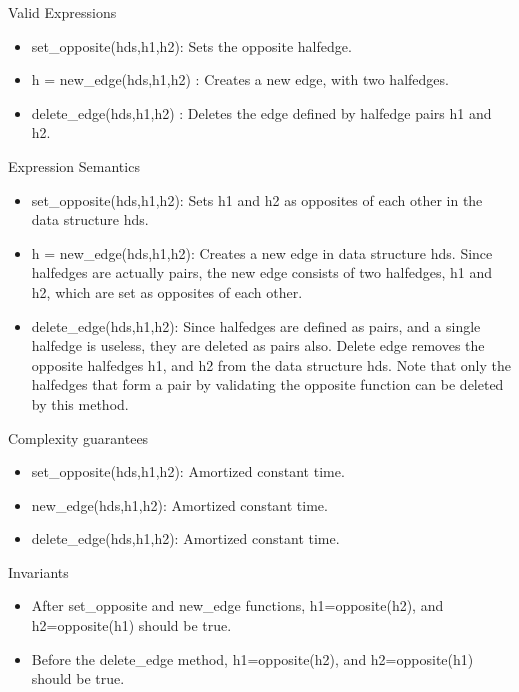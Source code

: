 \begin{Desc}
\item[Valid Expressions]\begin{itemize}
\item set\_\-opposite(hds,h1,h2): Sets the opposite halfedge.\item h = new\_\-edge(hds,h1,h2) : Creates a new edge, with two halfedges.\item delete\_\-edge(hds,h1,h2) : Deletes the edge defined by halfedge pairs h1 and h2.\end{itemize}
\end{Desc}
\begin{Desc}
\item[Expression Semantics]\begin{itemize}
\item set\_\-opposite(hds,h1,h2): Sets h1 and h2 as opposites of each other in the data structure hds.\item h = new\_\-edge(hds,h1,h2): Creates a new edge in data structure hds. Since halfedges are actually pairs, the new edge consists of two halfedges, h1 and h2, which are set as opposites of each other.\item delete\_\-edge(hds,h1,h2): Since halfedges are defined as pairs, and a single halfedge is useless, they are deleted as pairs also. Delete edge removes the opposite halfedges h1, and h2 from the data structure hds. Note that only the halfedges that form a pair by validating the opposite function can be deleted by this method.\end{itemize}
\end{Desc}
\begin{Desc}
\item[Complexity guarantees]\begin{itemize}
\item set\_\-opposite(hds,h1,h2): Amortized constant time.\item new\_\-edge(hds,h1,h2): Amortized constant time.\item delete\_\-edge(hds,h1,h2): Amortized constant time.\end{itemize}
\end{Desc}
\begin{Desc}
\item[Invariants]\begin{itemize}
\item After set\_\-opposite and new\_\-edge functions, h1=opposite(h2), and h2=opposite(h1) should be true.\item Before the delete\_\-edge method, h1=opposite(h2), and h2=opposite(h1) should be true.\end{itemize}
\end{Desc}
